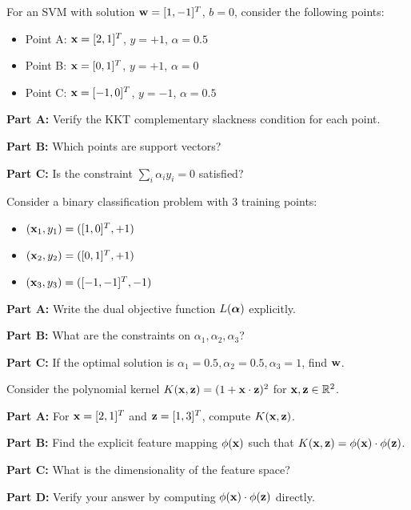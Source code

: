 \documentclass{article}
\newcounter{exercise}
\begin{document}
\begin{tcolorbox}[colback=blue!5!white,colframe=blue!75!black,title=Exercise \theexercise: KKT Conditions]
For an SVM with solution $\mathbf{w} = [1, -1]^T$, $b = 0$, consider the following points:
\begin{itemize}
    \item Point A: $\mathbf{x} = [2, 1]^T$, $y = +1$, $\alpha = 0.5$
    \item Point B: $\mathbf{x} = [0, 1]^T$, $y = +1$, $\alpha = 0$
    \item Point C: $\mathbf{x} = [-1, 0]^T$, $y = -1$, $\alpha = 0.5$
\end{itemize}

\textbf{Part A:} Verify the KKT complementary slackness condition for each point.

\textbf{Part B:} Which points are support vectors?

\textbf{Part C:} Is the constraint $\sum_i \alpha_i y_i = 0$ satisfied?
\end{tcolorbox}

\begin{tcolorbox}[colback=blue!5!white,colframe=blue!75!black,title=Exercise \theexercise: Dual Problem Setup]
Consider a binary classification problem with 3 training points:
\begin{itemize}
    \item $(\mathbf{x}_1, y_1) = ([1, 0]^T, +1)$
    \item $(\mathbf{x}_2, y_2) = ([0, 1]^T, +1)$
    \item $(\mathbf{x}_3, y_3) = ([-1, -1]^T, -1)$
\end{itemize}

\textbf{Part A:} Write the dual objective function $L(\boldsymbol{\alpha})$ explicitly.

\textbf{Part B:} What are the constraints on $\alpha_1, \alpha_2, \alpha_3$?

\textbf{Part C:} If the optimal solution is $\alpha_1 = 0.5, \alpha_2 = 0.5, \alpha_3 = 1$, find $\mathbf{w}$.
\end{tcolorbox}

\begin{tcolorbox}[colback=blue!5!white,colframe=blue!75!black,title=Exercise \theexercise: Kernel Computation]
Consider the polynomial kernel $K(\mathbf{x}, \mathbf{z}) = (1 + \mathbf{x} \cdot \mathbf{z})^2$ for $\mathbf{x}, \mathbf{z} \in \mathbb{R}^2$.

\textbf{Part A:} For $\mathbf{x} = [2, 1]^T$ and $\mathbf{z} = [1, 3]^T$, compute $K(\mathbf{x}, \mathbf{z})$.

\textbf{Part B:} Find the explicit feature mapping $\phi(\mathbf{x})$ such that $K(\mathbf{x}, \mathbf{z}) = \phi(\mathbf{x}) \cdot \phi(\mathbf{z})$.

\textbf{Part C:} What is the dimensionality of the feature space?

\textbf{Part D:} Verify your answer by computing $\phi(\mathbf{x}) \cdot \phi(\mathbf{z})$ directly.
\end{tcolorbox}
\end{document}
